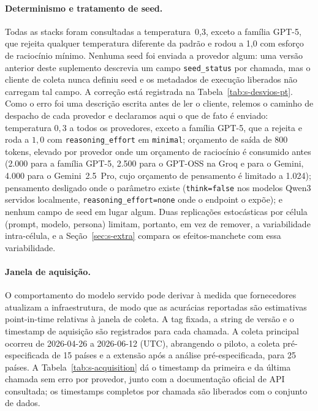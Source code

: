 \documentclass[11pt,a4paper]{article}
\begin{document}
\paragraph{Determinismo e tratamento de seed.} Todas as stacks foram consultadas a
temperatura~0,3, exceto a família GPT-5, que rejeita qualquer temperatura
diferente da padrão e rodou a 1,0 com esforço de raciocínio mínimo. Nenhuma
seed foi enviada a provedor algum: uma versão anterior deste suplemento
descrevia um campo \texttt{seed\_status} por chamada, mas o cliente de coleta
nunca definiu seed e os metadados de execução liberados não carregam tal campo.
A correção está registrada na Tabela~\ref{tab:s-desvios-pt}. Como o erro foi uma
descrição escrita antes de ler o cliente, relemos o caminho de despacho de cada
provedor e declaramos aqui o que de fato é enviado: temperatura $0{,}3$ a todos
os provedores, exceto a família GPT-5, que a rejeita e roda a $1{,}0$ com
\texttt{reasoning\_effort} em \texttt{minimal}; orçamento de saída de 800
tokens, elevado por provedor onde um orçamento de raciocínio é consumido antes
(2.000 para a família GPT-5, 2.500 para o GPT-OSS na Groq e para o Gemini, 4.000
para o Gemini~2.5~Pro, cujo orçamento de pensamento é limitado a 1.024);
pensamento desligado onde o parâmetro existe (\texttt{think=false} nos modelos
Qwen3 servidos localmente, \texttt{reasoning\_effort=none} onde o endpoint o
expõe); e nenhum campo de seed em lugar algum. Duas replicações estocásticas por
célula (prompt, modelo, persona) limitam, portanto, em vez de remover, a
variabilidade intra-célula, e a Seção~\ref{sec:s-extra} compara os
efeitos-manchete com essa variabilidade.

\paragraph{Janela de aquisição.} O comportamento do modelo servido pode derivar à
medida que fornecedores atualizam a infraestrutura, de modo que as acurácias
reportadas são estimativas point-in-time relativas à janela de coleta. A tag
fixada, a string de versão e o timestamp de aquisição são registrados para cada
chamada. A coleta principal ocorreu de 2026-04-26 a 2026-06-12 (UTC),
abrangendo o piloto, a coleta pré-especificada de 15 países e a extensão
após a análise pré-especificada, para 25 países. A Tabela~\ref{tab:s-acquisition} dá o timestamp
da primeira e da última chamada sem erro por provedor, junto com a documentação
oficial de API consultada; os timestamps completos por chamada são liberados com o
conjunto de dados.
\end{document}
